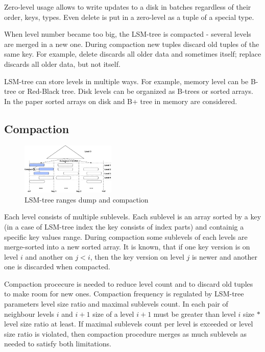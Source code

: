 \documentclass{vldb}
\begin{document}
Zero-level usage allows to write updates to a disk in batches regardless of
their order, keys, types. Even delete is put in a zero-level as a tuple of a
special type.

When level number became too big, the LSM-tree is compacted - several levels are
merged in a new one. During compaction new tuples discard old tuples of the same
key. For example, delete discards all older data and sometimes itself; replace
discards all older data, but not itself.

LSM-tree can store levels in multiple ways. For example, memory level can be
B-tree or Red-Black tree. Disk levels can be organized as B-trees or sorted
arrays. In the paper sorted arrays on disk and B+ tree in memory are considered.

\subsection{Compaction}
\begin{figure}
\centering
\includegraphics[width=0.4\textwidth]{compaction_schema}
\caption{LSM-tree ranges dump and compaction}
\label{fig:compaction_schema}
\end{figure}
Each level consists of multiple sublevels. Each sublevel is an array sorted by
a key (in a case of LSM-tree index the key consists of index parts) and
containig a specific key values range. During compaction some sublevels of each
levels are merge-sorted into a new sorted array. It is known, that if one key
version is on level $i$ and another on $j < i$, then the key version on level
$j$ is newer and another one is discarded when compacted.

Compaction procecure is needed to reduce level count and to discard old tuples
to make room for new ones. Compaction frequency is regulated by LSM-tree
parameters level size ratio and maximal sublevels count. In each pair of
neighbour levels $i$ and $i + 1$ size of a level $i + 1$ must be greater than
level $i$ size $*$ level size ratio at least. If maximal sublevels count per
level is exceeded or level size ratio is violated, then compaction procedure
merges as much sublevels as needed to satisfy both limitations.
\end{document}
